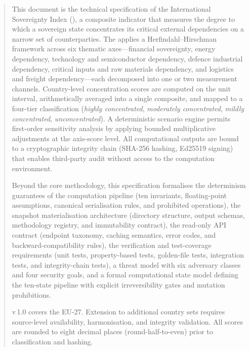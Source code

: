 \begin{abstract}
\noindent
This document is the technical specification of the International Sovereignty
Index (\ISI), a composite indicator that measures the degree to which a
sovereign state concentrates its critical external dependencies on a narrow set
of counterparties.  The \ISI applies a Herfindahl--Hirschman framework across
six thematic axes---financial sovereignty, energy dependency, technology and
semiconductor dependency, defence industrial dependency, critical inputs and
raw materials dependency, and logistics and freight dependency---each
decomposed into one or two measurement channels.  Country-level concentration
scores are computed on the unit interval, arithmetically averaged into a
single composite, and mapped to a four-tier classification (\emph{highly
concentrated}, \emph{moderately concentrated}, \emph{mildly concentrated},
\emph{unconcentrated}).  A deterministic scenario engine permits first-order
sensitivity analysis by applying bounded multiplicative adjustments at the
axis-score level.  All computational outputs are bound to a cryptographic
integrity chain (SHA-256 hashing, Ed25519 signing) that enables third-party
audit without access to the computation environment.

Beyond the core methodology, this specification formalises the determinism
guarantees of the computation pipeline (ten invariants, floating-point
assumptions, canonical serialisation rules, and prohibited operations), the
snapshot materialisation architecture (directory structure, output schemas,
methodology registry, and immutability contract), the read-only API contract
(endpoint taxonomy, caching semantics, error codes, and backward-compatibility
rules), the verification and test-coverage requirements (unit tests,
property-based tests, golden-file tests, integration tests, and
integrity-chain tests), a threat model with six adversary classes and four
security goals, and a formal computational state model defining the
ten-state pipeline with explicit irreversibility gates and mutation
prohibitions.

\ISI v\,1.0 covers the EU-27.  Extension to additional country sets requires
source-level availability, harmonisation, and integrity validation.  All
scores are rounded to eight decimal places (round-half-to-even) prior to
classification and hashing.
\end{abstract}
